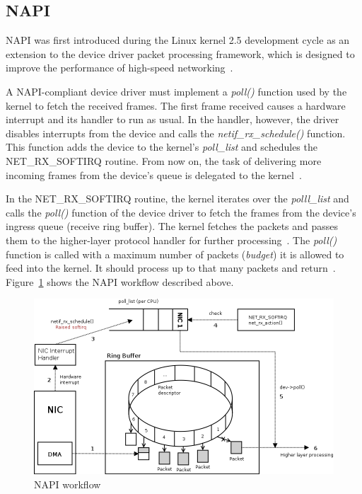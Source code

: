 
\subsection{NAPI}\label{subsec:linux-ingress-napi}
NAPI was first introduced during the Linux kernel 2.5 development cycle as
an extension to the device driver packet processing framework,
which is designed to improve the performance of high-speed networking~\cite{linux-foundation-napi}.

A NAPI-compliant device driver must implement a {\it{poll()}} function used by the kernel to fetch the received frames.
The first frame received causes a hardware interrupt and its handler to run as usual.
In the handler, however, the driver disables interrupts from the device
and calls the {\it{netif\_rx\_schedule()}} function.
This function adds the device to the kernel's {\it{poll\_list}} and schedules the NET\_RX\_SOFTIRQ routine.
From now on, the task of delivering more incoming frames from
the device's queue is delegated to the kernel~\cite{understanding-internals}.

In the NET\_RX\_SOFTIRQ routine, the kernel iterates over the {\it{polll\_list}} and calls
the {\it{poll()}} function of the device driver to fetch the frames from the device's ingress queue (receive ring buffer).
The kernel fetches the packets and passes them to the higher-layer protocol handler for further processing~\cite{linux-kernel-networking}.
The {\it{poll()}} function is called with a maximum number
of packets ({\it{budget}}) it is allowed to feed into the kernel.
It should process up to that many packets and return~\cite{reworking-napi}.
Figure~\ref{fig:linux-napi-workflow} shows the NAPI workflow described above.

\begin{figure}
	\centering
	\includegraphics[width=15cm,keepaspectratio]{fig/napi-workflow.png}
	\caption{NAPI workflow}
	\label{fig:linux-napi-workflow}
\end{figure}

